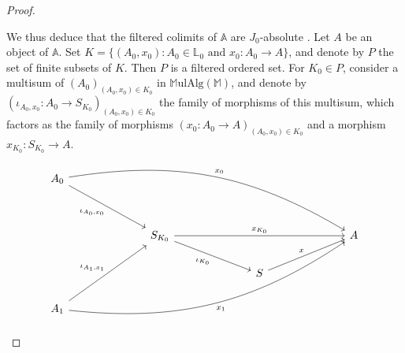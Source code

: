 \documentclass{article}
\newcommand{\bb}[1]{{\mathbb{#1}}}
\newcommand{\MulAlg}{\mathbb{M}\mathrm{ulAlg}}
\begin{document}
\begin{proof}
\begin{enumerate}[a)]
      We thus deduce that the filtered colimits of $\bb{A}$ are $J_0$-absolute \cite{4}.
      Let $A$ be an object of $\bb{A}$.
      Set $K=\{(A_0,x_0):\mbox{$A_0\in\bb{L}_0$ and $x_0\colon A_0\to A$}\}$, and denote by $P$ the set of finite subsets of $K$.
      Then $P$ is a filtered ordered set.
      For $K_0\in P$, consider a multisum of $(A_0)_{(A_0,x_0)\in K_0}$ in $\MulAlg(\bb{M})$, and denote by $(\iota_{A_0,x_0}\colon A_0\to S_{K_0})_{(A_0,x_0)\in K_0}$ the family of morphisms of this multisum, which factors as the family of morphisms $(x_0\colon A_0\to A)_{(A_0,x_0)\in K_0}$ and a morphism $x_{K_0}\colon S_{K_0}\to A$.
      \[
        \begin{tikzcd}[column sep=7em]
          A_0 \ar[ddr,swap,"\iota_{A_0,x_0}"] \ar[ddrrr,bend left=20,"x_0"]
        \\
        \\&S_{K_0} \ar[dr,swap,"\iota_{K_0}"] \ar[rr,"x_{K_0}"]
          && A
        \\&& S \ar[ru,"x"]
        \\A_1 \ar[uur,"\iota_{A_1,x_1}"] \ar[uurrr,bend right=20,swap,"x_1"]
        \end{tikzcd}
      \]


\end{enumerate}
\end{proof}
\end{document}
